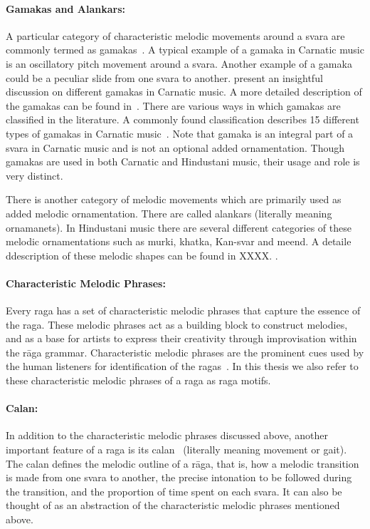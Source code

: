 \paragraph{Gamakas and Alankars:} A particular category of characteristic melodic movements around a \gls{svara} are commonly termed as \glspl{gamaka}~\cite{krishna2012carnatic}. A typical example of a \gls{gamaka} in Carnatic music is an oscillatory pitch movement around a \gls{svara}. Another example of a \gls{gamaka} could be a peculiar slide from one \gls{svara} to another. \cite{krishna2012carnatic} present an insightful discussion on different \glspl{gamaka} in Carnatic music. A more detailed description of the \glspl{gamaka} can be found in~\cite{narayanswami2011}. There are various ways in which \glspl{gamaka} are classified in the literature. A commonly found classification describes 15 different types of \glspl{gamaka} in Carnatic music~\cite{ramanathan1999musical,janakiraman2008essentials,narayanswami2011}. Note that \gls{gamaka} is an integral part of a \gls{svara} in Carnatic music and is not an optional added ornamentation. Though \glspl{gamaka} are used in both Carnatic and Hindustani music, their usage and role is very distinct. 

There is another category of melodic movements which are primarily used as added melodic ornamentation. There are called alankars (literally meaning ornamanets). In Hindustani music there are several different categories of these melodic ornamentations such as murki, khatka, Kan-svar and meend. A detaile ddescription of these melodic shapes can be found in XXXX. .

\paragraph{Characteristic Melodic Phrases:} Every \gls{raga} has a set of characteristic melodic phrases that capture the essence of the \gls{raga}. These melodic phrases act as a building block to construct melodies, and as a base for artists to express their creativity through improvisation within the r\={a}ga grammar. Characteristic melodic phrases are the prominent cues used by the human listeners for identification of the \glspl{raga}~\cite{krishna2012carnatic}. In this thesis we also refer to these characteristic melodic phrases of a \gls{raga} as \gls{raga} motifs.

\paragraph{Calan:} In addition to the characteristic melodic phrases discussed above, another important feature of a \gls{raga} is its calan~\cite{rao1999raga} (literally meaning movement or gait). The calan defines the melodic outline of a r\={a}ga, that is, how a melodic transition is made from one \gls{svara} to another, the precise intonation to be followed during the transition, and the proportion of time spent on each svara. It can also be thought of as an abstraction of the characteristic melodic phrases mentioned above.


